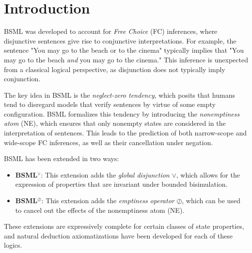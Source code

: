 
\section{Introduction}\label{sec:Introduction}

BSML was developed to account for \textit{Free Choice} (FC) inferences, where disjunctive sentences give rise to conjunctive interpretations. For example, the sentence "You may go to the beach or to the cinema" typically implies that "You may go to the beach \textit{and} you may go to the cinema." This inference is unexpected from a classical logical perspective, as disjunction does not typically imply conjunction.

The key idea in BSML is the \textit{neglect-zero tendency}, which posits that humans tend to disregard models that verify sentences by virtue of some empty configuration. BSML formalizes this tendency by introducing the \textit{nonemptiness atom} (NE), which ensures that only nonempty states are considered in the interpretation of sentences. This leads to the prediction of both narrow-scope and wide-scope FC inferences, as well as their cancellation under negation.

BSML has been extended in two ways:
\begin{itemize}
    \item \textbf{BSML\(^\vee\)}: This extension adds the \textit{global disjunction} \(\vee\), which allows for the expression of properties that are invariant under bounded bisimulation.
    \item \textbf{BSML\(^\oslash\)}: This extension adds the \textit{emptiness operator} \(\oslash\), which can be used to cancel out the effects of the nonemptiness atom (NE).
\end{itemize}

These extensions are expressively complete for certain classes of state properties, and natural deduction axiomatizations have been developed for each of these logics.